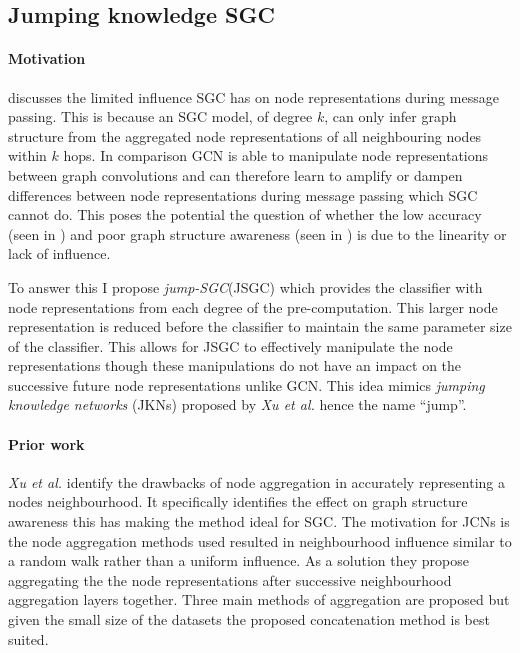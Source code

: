 \subsection{Jumping knowledge SGC}
\paragraph{Motivation}
 discusses the limited influence SGC has on node representations during message passing.
This is because an SGC model, of degree $k$, can only infer graph structure from the aggregated node representations of all neighbouring nodes within $k$ hops.
In comparison GCN is able to manipulate node representations between graph convolutions and can therefore learn to amplify or dampen differences between node representations during message passing which SGC cannot do.
This poses the potential the question of whether the low accuracy (seen in ) and poor graph structure awareness (seen in ) is due to the linearity or lack of influence.

To answer this I propose \emph{jump-SGC}(JSGC) which provides the classifier with node representations from each degree of the pre-computation.
This larger node representation is reduced before the classifier to maintain the same parameter size of the classifier.
This allows for JSGC to effectively manipulate the node representations though these manipulations do not have an impact on the successive future node representations unlike GCN.
This idea mimics \emph{jumping knowledge networks} (JKNs) proposed by \textit{Xu et al.}\cite{xu2018representation} hence the name ``jump''.

\paragraph{Prior work}
\textit{Xu et al.}\cite{xu2018representation} identify the drawbacks of node aggregation in accurately representing a nodes neighbourhood.
It specifically identifies the effect on graph structure awareness this has making the method ideal for SGC.
The motivation for JCNs is the node aggregation methods used resulted in neighbourhood influence similar to a random walk rather than a uniform influence.
As a solution they propose aggregating the the node representations after successive neighbourhood aggregation layers together.
Three main methods of aggregation are proposed but given the small size of the datasets the proposed concatenation method is best suited.

